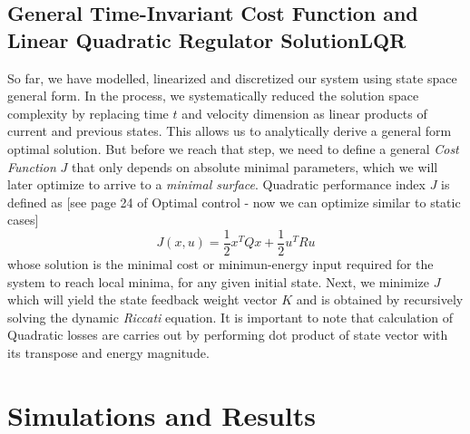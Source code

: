 \documentclass[journal]{IEEEtran}
\begin{document}
\subsection{General Time-Invariant Cost Function and Linear Quadratic Regulator SolutionLQR}
So far, we have modelled, linearized and discretized our system using state
space general form. In the process, we systematically reduced the solution space
complexity by replacing time \(t\) and velocity dimension as linear products of
current and previous states. This allows us to analytically derive a general
form optimal solution. But before we reach that step, we need to define a
general \emph{Cost Function} \(J\) that only depends on absolute minimal parameters,
which we will later optimize to arrive to a \emph{minimal surface}. Quadratic
performance index \(J \) is
defined as [see page 24 of Optimal control - now we can optimize similar to static cases]
\begin{equation}
J(x,u) = \frac{1}{2}x^{T}Q x + \frac{1}{2}u^{T}Ru
\end{equation}
whose solution is the minimal cost or minimun-energy input required for the
system to reach local minima, for any given initial state. Next, we minimize \(J\)
which will yield the state feedback weight vector \(K\) and is obtained by
recursively solving the dynamic \emph{Riccati} equation.
It is important to note that calculation of Quadratic losses are carries out by
performing dot product of state vector with its transpose and energy magnitude.


\section{Simulations and Results}






%
%
\end{document}
